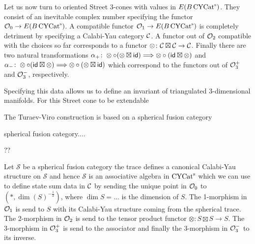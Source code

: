 Let us now turn to oriented Street 3-cones with values in $E(B\operatorname{\mathrm{CYCat}^s})$. They consist of an inevitable complex number specifying the functor $\mathcal{O}_0 \to E(B\operatorname{\mathrm{CYCat}^s})$. A compatible functor $\mathcal{O}_1 \to E(B\operatorname{\mathrm{CYCat}^s})$ is completely detriment by specifying a Calabi-Yau category $\mathcal{C}$. A functor out of $\mathcal{O}_2$ compatible with the choices so far corresponds to a functor $\otimes \colon \mathcal{C} \boxtimes \mathcal{C} \to \mathcal{C}$. Finally there are two natural transformations $\alpha_+\colon \otimes \circ (\otimes \boxtimes \mathsf{id} ) \Longrightarrow \otimes \circ (\mathsf{id} \boxtimes \otimes )$ and $\alpha_-\colon \otimes \circ (\mathsf{id} \boxtimes \otimes ) \Longrightarrow \otimes \circ (\otimes \boxtimes \mathsf{id} )$ which correspond to the functors out of $\mathcal{O}_3^+$ and $\mathcal{O}_3^-$, respectively.    

Specifying this data allows us to define an invariant of triangulated 3-dimensional manifolds. For this Street cone to be extendable  

The Turaev-Viro construction is based on a spherical fusion category
\begin{definition}
    spherical fusion category....
\end{definition}
\begin{example}
    ??
\end{example}
Let $\mathcal{S}$ be a spherical fusion category the trace defines a canonical Calabi-Yau structure on $\mathcal{S}$ and hence $\mathcal{S}$ is an associative algebra in $\operatorname{\mathrm{CYCat}^s}$ which we can use to define state sum data in $\mathcal{C}$ by sending the unique point in $\mathcal{O}_0$ to $(*,\dim (S)^{-\tfrac{1}{2}})$, where $\dim S = ...$ is the dimension of $S$. The 1-morphism in $\mathcal{O}_1$ is send to $S$ with its Calabi-Yau structure coming from the spherical trace. The 2-morphism in $\mathcal{O}_2$ is send to the tensor product functor $\otimes \colon S\boxtimes S \to S$. The 3-morphism in $\mathcal{O}_3^+$ is send to the associator and finally the 3-morphism in $\mathcal{O}_3^-$ to its inverse.